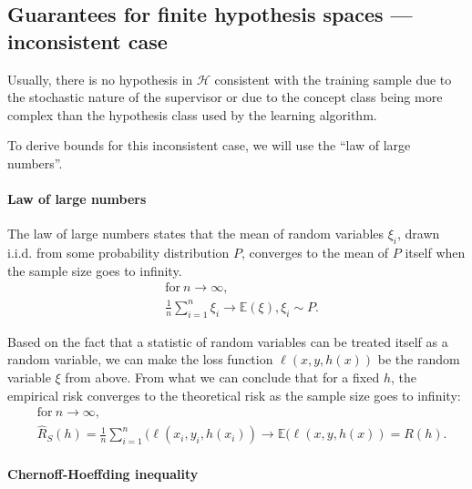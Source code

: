 \documentclass[
  letterpaper,
  12pt,
  british]{tufte-book}
\let\oldparagraph\paragraph
\renewcommand{\paragraph}[1]{\oldparagraph{#1}\mbox{}}
\theoremstyle{plain}
\theoremstyle{definition}
\theoremstyle{plain}
\theoremstyle{remark}
\begin{document}
\hypertarget{guarantees-for-finite-hypothesis-spaces-inconsistent-case}{%
\subsection{Guarantees for finite hypothesis spaces --- inconsistent
case}\label{guarantees-for-finite-hypothesis-spaces-inconsistent-case}}

Usually, there is no hypothesis in \(\mathcal{H}\) consistent with the
training sample due to the stochastic nature of the supervisor or due to
the concept class being more complex than the hypothesis class used by
the learning algorithm.

To derive bounds for this inconsistent case, we will use the ``law of
large numbers''.

\hypertarget{law_of_large_numbers}{%
\paragraph{Law of large numbers}\label{law_of_large_numbers}}

The law of large numbers states that the mean of random variables
\(\xi_i\), drawn i.i.d. from some probability distribution \(P\),
converges to the mean of \(P\) itself when the sample size goes to
infinity. \begin{align}
    &\text{for}~n \to \infty, \nonumber\\
    &\frac{1}{n} \sum_{i=1}^{n}\xi_i \to \mathbb{E}(\xi), \xi_i \sim P.
\end{align}

Based on the fact that a statistic of
random variables can be treated itself as a random variable, we can make
the loss function \(\ell(\mathit{x}, \mathit{y}, h(\mathit{x}))\) be the
random variable \(\xi\) from above. From what we can conclude that for a
fixed \(h\), the empirical risk converges to the theoretical risk as the
sample size goes to infinity: \begin{align}
    &\text{for}~n \to \infty, \nonumber\\
    &\hat{R}_{S}(h) = \frac{1}{n} \sum_{i=1}^{n}(\ell(\mathit{x}_i, \mathit{y}_i, h(\mathit{x}_i)) \to \mathbb{E}(\ell(x, y, h(\mathit{x}))=R(h).
\end{align}

\hypertarget{sec-chernoff}{%
\paragraph{Chernoff-Hoeffding inequality}\label{sec-chernoff}}
\end{document}
